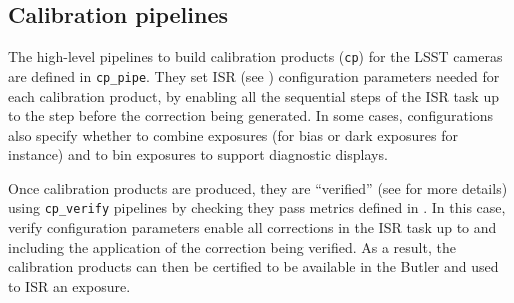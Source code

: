 \subsection{Calibration pipelines}
\label{sec:calib_pipe}

The high-level pipelines to build calibration products (\texttt{cp}) for the LSST cameras are defined in \texttt{cp\_pipe}.
They set ISR (see ) configuration parameters needed for each calibration product, by enabling all the sequential steps of the ISR task up to the step before the correction being generated.
In some cases, configurations also specify whether to combine exposures (for bias or dark exposures for instance) and to bin exposures to support diagnostic displays.

Once calibration products are produced, they are ``verified'' (see \citet{DMTN-222} for more details) using \texttt{cp\_verify} pipelines by checking they pass metrics defined in \citet{DMTN-101}.
In this case, verify configuration parameters enable all corrections in the ISR task up to and including the application of the correction being verified. As a result, the calibration products can then be certified to be available in the Butler and used to ISR an exposure.
